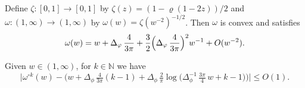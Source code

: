 \begin{definition}
Define \( \zeta : [0,1] \to [0,1] \) by \( \zeta(z) = (1 - \varrho(1-2z))/2 \) and \( \omega : (1,\infty) \to (1,\infty) \) by \( \omega(w) = \zeta(w^{-2})^{-1/2} \). Then \( \omega \) is convex and satisfies
\[
\omega(w) = w + \Delta_\phi\,\frac{4}{3\pi} + \frac{3}{2}\Bigl(\Delta_\phi\,\frac{4}{3\pi}\Bigr)^2 w^{-1} + O(w^{-2}).
\]
\end{definition}

\begin{proposition}\label{prop:rflr-inverse-cosine-prop}
Given \( w \in (1,\infty) \), for \( k \in \mathbb{N} \) we have
\[
\bigl\vert \omega^{\circ k}(w) - \bigl( w + \Delta_\phi\,\tfrac{4}{3\pi}(k-1) + \Delta_\phi\,\tfrac{2}{\pi}\log\bigl( \Delta_\phi^{-1}\,\tfrac{3\pi}{4}\,w + k - 1 \bigr) \bigr) \bigr\vert \le O(1).
\]
\end{proposition}
